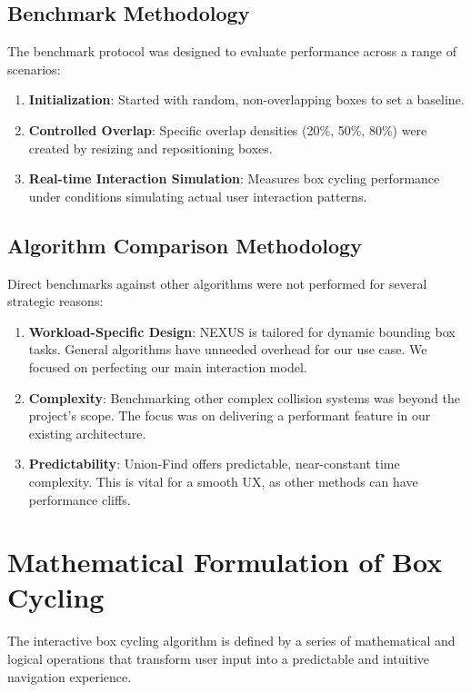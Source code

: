 \documentclass[10pt]{article}
\begin{document}
\subsection{Benchmark Methodology}
The benchmark protocol was designed to evaluate performance across a range of scenarios:
\begin{enumerate}
    \item \textbf{Initialization}: Started with random, non-overlapping boxes to set a baseline.

    \item \textbf{Controlled Overlap}: Specific overlap densities (20\%, 50\%, 80\%) were created by resizing and repositioning boxes.

    \item \textbf{Real-time Interaction Simulation}: Measures box cycling performance under conditions simulating actual user interaction patterns.
\end{enumerate}

\subsection{Algorithm Comparison Methodology}
Direct benchmarks against other algorithms were not performed for several strategic reasons:

\begin{enumerate}
    \item \textbf{Workload-Specific Design}: NEXUS is tailored for dynamic bounding box tasks. General algorithms have unneeded overhead for our use case. We focused on perfecting our main interaction model.

    \item \textbf{Complexity}: Benchmarking other complex collision systems was beyond the project's scope. The focus was on delivering a performant feature in our existing architecture.

    \item \textbf{Predictability}: Union-Find offers predictable, near-constant time complexity. This is vital for a smooth UX, as other methods can have performance cliffs.
\end{enumerate}

\section{Mathematical Formulation of Box Cycling}
The interactive box cycling algorithm is defined by a series of mathematical and logical operations that transform user input into a predictable and intuitive navigation experience.
\end{document}
